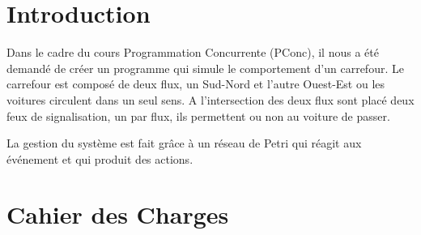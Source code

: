 \documentclass[11pt,a4paper, openany]{memoir}
\begin{document}





\chapter{Introduction}

Dans le cadre du cours Programmation Concurrente (PConc), il nous a été demandé de créer un programme qui simule le comportement d'un carrefour. Le carrefour est composé de deux flux, un Sud-Nord et l'autre Ouest-Est ou les voitures circulent dans un seul sens. A l'intersection des deux flux sont placé deux feux de signalisation, un par flux, ils permettent ou non au voiture de passer.\par
La gestion du système est fait grâce à un réseau de Petri qui réagit aux événement et qui produit des actions.

\chapter{Cahier des Charges}
\end{document}
